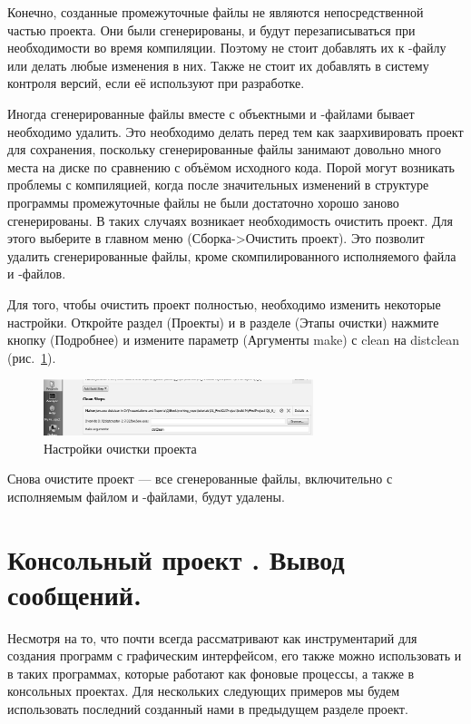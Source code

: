 Конечно, созданные промежуточные файлы не являются непосредственной частью проекта. Они были
сгенерированы, и будут перезаписываться при необходимости во время компиляции. Поэтому не стоит добавлять их к
-файлу или делать любые изменения в них. Также не стоит их добавлять
в систему контроля версий, если её используют при разработке.

Иногда сгенерированные файлы вместе с объектными и -файлами бывает
необходимо удалить. Это необходимо делать перед тем как заархивировать проект для сохранения, поскольку сгенерированные
файлы занимают довольно много места на диске по сравнению с объёмом исходного кода. Порой могут возникать
проблемы с компиляцией, когда после значительных изменений в структуре программы промежуточные файлы не были достаточно
хорошо заново сгенерированы. В таких случаях возникает необходимость очистить проект. Для этого выберите в главном
меню  (Сборка->Очистить проект).
Это позволит удалить сгенерированные файлы, кроме скомпилированного исполняемого файла и
-файлов.

Для того, чтобы очистить
проект полностью, необходимо изменить некоторые настройки. Откройте раздел
 (Проекты) и в разделе
 (Этапы очистки) нажмите кнопку
 (Подробнее) и измените параметр
 (Аргументы make)
с clean на distclean (рис.~\ref{ch12:refDrawing1}).

\begin{figure}[htb]
\begin{center}
\includegraphics[width=0.7\textwidth]{img/ris_12_2}
\caption{Настройки очистки проекта}
\label{ch12:refDrawing1}
\end{center}
\end{figure}

Снова очистите проект --- все сгенерованные файлы, включительно с исполняемым файлом и -файлами, будут
удалены.

\section[Консольный проект \Sys{Qt}.Вывод сообщений.]{Консольный проект . Вывод сообщений.}
Несмотря на то, что  почти всегда рассматривают как
инструментарий для создания программ с графическим интерфейсом, его также можно использовать и в таких программах,
которые работают как фоновые процессы, а также в консольных проектах. Для нескольких следующих примеров
мы будем использовать последний созданный нами в предыдущем разделе проект.

